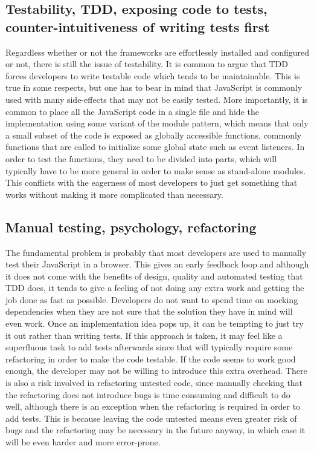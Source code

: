 \documentclass[11pt]{article}
\begin{document}
\subsection{Testability, TDD, exposing code to tests, counter-intuitiveness of writing tests first}

Regardless whether or not the frameworks are effortlessly installed and configured or not, there is still the issue of testability. It is common to argue that TDD forces developers to write testable code which tends to be maintainable. This is true in some respects, but one has to bear in mind that JavaScript is commonly used with many side-effects that may not be easily tested. More importantly, it is common to place all the JavaScript code in a single file and hide the implementation using some variant of the module pattern\cite[p.~40]{GoodParts}, which means that only a small subset of the code is exposed as globally accessible functions, commonly functions that are called to initialize some global state such as event listeners. In order to test the functions, they need to be divided into parts, which will typically have to be more general in order to make sense as stand-alone modules. This conflicts with the eagerness of most developers to just get something that works without making it more complicated than necessary.

\subsection{Manual testing, psychology, refactoring}

The fundamental problem is probably that most developers are used to manually test their JavaScript in a browser. This gives an early feedback loop and although it does not come with the benefits of design, quality and automated testing that TDD does, it tends to give a feeling of not doing any extra work and getting the job done as fast as possible. Developers do not want to spend time on mocking dependencies when they are not sure that the solution they have in mind will even work. Once an implementation idea pops up, it can be tempting to just try it out rather than writing tests. If this approach is taken, it may feel like a superfluous task to add tests afterwards since that will typically require some refactoring in order to make the code testable. If the code seems to work good enough, the developer may not be willing to introduce this extra overhead. There is also a risk involved in refactoring untested code\cite[p.~17]{Refactoring}, since manually checking that the refactoring does not introduce bugs is time consuming and difficult to do well, although there is an exception when the refactoring is required in order to add tests. This is because leaving the code untested means even greater risk of bugs and the refactoring may be necessary in the future anyway, in which case it will be even harder and more error-prone.
\end{document}

